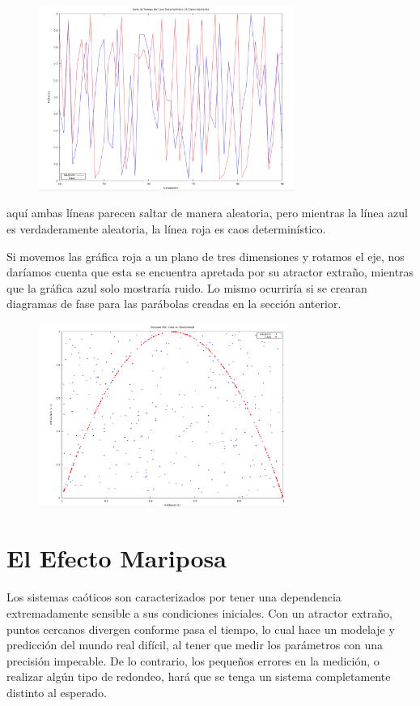 \documentclass{article}
\begin{document}
	\begin{figure}[h!]
    \includegraphics[height=6cm]{graf10.png}
    \centering
    \end{figure}

aquí ambas líneas parecen saltar de manera aleatoria, pero mientras la línea azul es verdaderamente aleatoria, la línea roja es caos determinístico.

Si movemos las gráfica roja a un plano de tres dimensiones y rotamos el eje, nos daríamos cuenta que esta se encuentra apretada por su atractor extraño, mientras que la gráfica azul solo mostraría ruido.	Lo mismo ocurriría si se crearan diagramas de fase para las parábolas creadas en la sección anterior.

	\begin{figure}[h!]
    \includegraphics[height=6cm]{graf11.png}
    \centering
    \end{figure}

\section{El Efecto Mariposa}
Los sistemas caóticos son caracterizados por tener una dependencia extremadamente sensible a sus condiciones iniciales. Con un atractor extraño, puntos cercanos divergen conforme pasa el tiempo, lo cual hace un modelaje y predicción del mundo real difícil, al tener que medir los parámetros con una precisión impecable. De lo contrario, los pequeños errores en la medición, o realizar algún tipo de redondeo, hará que se tenga un sistema completamente distinto al esperado.
\end{document}
